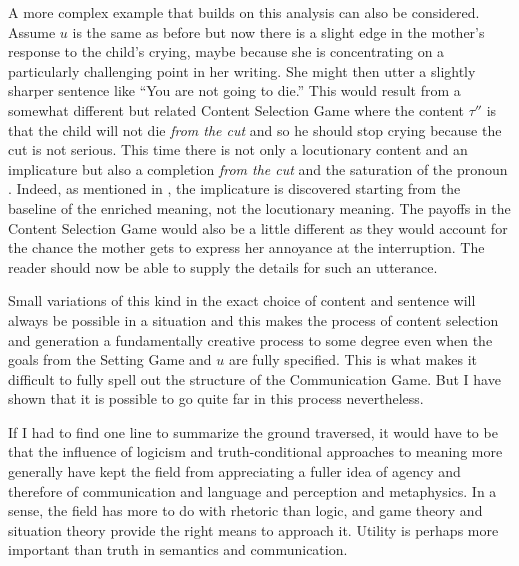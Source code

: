 A more complex example that builds on this analysis can also be considered. Assume $u$ is the same as before but now there is a slight edge in the mother's response to the child's crying, maybe because she is concentrating on a particularly challenging point in her writing. She might then utter a slightly sharper sentence like ``You are not going to die.'' This would result from a somewhat different but related Content Selection Game where the content $\tau''$ is that the child will not die \emph{from the cut} and so he should stop crying because the cut is not serious. This time there is not only a locutionary content and an implicature but also a completion \emph{from the cut} and the saturation of the pronoun . Indeed, as mentioned in  , the implicature is discovered starting from the baseline of the enriched meaning, not the locutionary meaning. The payoffs in the Content Selection Game would also be a little different as they would account for the chance the mother gets to express her annoyance at the interruption. The reader should now be able to supply the details for such an utterance.

Small variations of this kind in the exact choice of content and sentence will always be possible in a situation and this makes the process of content selection and generation a fundamentally creative process to some degree even when the goals from the Setting Game and $u$ are fully specified. This is what makes it difficult to fully spell out the structure of the Communication Game. But I have shown that it is possible to go quite far in this process nevertheless.

If I had to find one line to summarize the ground traversed, it would have to be that the influence of logicism and truth-conditional approaches to meaning more generally have kept the field from appreciating a fuller idea of agency and therefore of communication and language and perception and metaphysics. In a sense, the field has more to do with rhetoric than logic, and game theory and situation theory provide the right means to approach it. Utility is perhaps more important than truth in semantics and communication.
